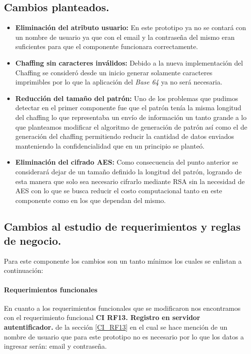 \documentclass[12pt, a4paper, titlepage]{report}
\begin{document}
		    \subsection{Cambios planteados.}
    		    \begin{itemize}
    		        \item \textbf{Eliminación del atributo usuario: } En este prototipo ya no se contará con un nombre de usuario ya que con el email y la contraseña del mismo eran suficientes para que el componente funcionara correctamente.
    		        \item \textbf{Chaffing sin caracteres inválidos: }Debido a la nueva implementación del Chaffing se consideró desde un inicio generar solamente caracteres imprimibles por lo que la aplicación del \textit{Base 64} ya no será necesaria. 
    		        \item \textbf{Reducción del tamaño del patrón: }  Uno de los problemas que pudimos detectar en el primer componente fue que el patrón tenía la misma longitud del chaffing lo que representaba un envío de información un tanto grande a lo que planteamos modificar el algoritmo de generación de patrón así como el de generación del chaffing permitiendo reducir la cantidad de datos enviados manteniendo la confidencialidad que en un principio se planteó.
    		        \item \textbf{Eliminación del cifrado AES: } Como consecuencia del punto anterior se considerará dejar de un tamaño definido la longitud del patrón, logrando de esta manera que solo sea necesario cifrarlo mediante RSA sin la necesidad de AES con lo que se busca reducir el costo computacional tanto en este componente como en los que dependan del mismo. 
    		    \end{itemize}
    		    
		    \subsection{Cambios al estudio de requerimientos y reglas de negocio.}

                Para este componente los cambios son un tanto mínimos los cuales se enlistan a continuación:
                \paragraph{Requerimientos funcionales} En cuanto a los requerimientos funcionales que se modificaron nos encontramos con el requerimiento funcional \textbf{CI RF13. Registro en servidor autentificador.} de la sección \ref{CI_RF13} en el cual se hace mención de un nombre de usuario que para este prototipo no es necesario por lo que los datos a ingresar serán: email y contraseña.
                
\end{document}
